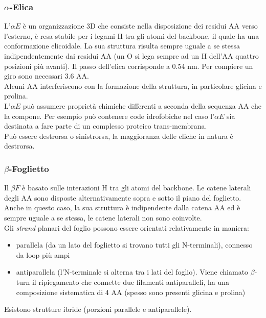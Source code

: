         \subsubsection{$\alpha$-Elica}
            L'$\alpha E$ è un organizzazione 3D che consiste nella disposizione dei residui AA verso l'esterno, è resa stabile per i legami H tra gli atomi del backbone, il quale ha una conformazione elicoidale. 
            La sua struttura risulta sempre uguale a se stessa indipendentemente dai residui AA (un O si lega sempre ad un H dell'AA quattro posizioni più avanti). Il passo dell'elica corrisponde a 0.54 nm. Per compiere un giro sono necessari 3.6 AA.\\
            Alcuni AA interferiscono con la formazione della struttura, in particolare glicina e prolina.\\
            L'$\alpha E$ può assumere proprietà chimiche differenti a seconda della sequenza AA che la compone. 
            Per esempio può contenere code idrofobiche nel caso l'$\alpha E$ sia destinata a fare parte di un complesso proteico trans-membrana.\\
            Può essere destrorsa o sinistrorsa, la maggioranza delle eliche in natura è destrorsa.
        
        \subsubsection{$\beta$-Foglietto}
            Il $\beta F$ è basato sulle interazioni H tra gli atomi del backbone. Le catene laterali degli AA sono disposte alternativamente sopra e sotto il piano del foglietto. Anche in questo caso, la sua struttura è indipendente dalla catena AA ed è sempre uguale a se stessa, le catene laterali non sono coinvolte. \\
            Gli \textit{strand} planari del foglio possono essere orientati relativamente in maniera:
            \begin{itemize}
                \item parallela (da un lato del foglietto si trovano tutti gli N-terminali), connesso da loop più ampi
                \item antiparallela (l'N-terminale si alterna tra i lati del foglio). 
                Viene chiamato $\beta$-turn il ripiegamento che connette due filamenti antiparalleli, ha una composizione sistematica di 4 AA (spesso sono presenti glicina e prolina)
            \end{itemize}
            Esistono strutture ibride (porzioni parallele e antiparallele).
    
